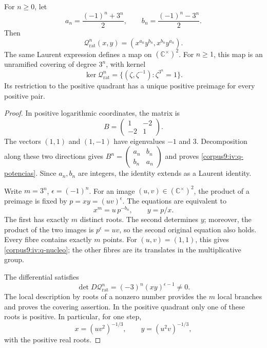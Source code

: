 \begin{proposition}
\label{corpus9:iv:q-iteracion}
For \(n\geq0\), let
\[
 a_n=\frac{(-1)^n+3^n}{2},\qquad
 b_n=\frac{(-1)^n-3^n}{2}.
\]
Then
\begin{equation}
 \mathcal Q_{\mathrm{rat}}^n(x,y)
   =(x^{a_n}y^{b_n},x^{b_n}y^{a_n}).
 \label{corpus9:iv:q-potencias}
\end{equation}
The same Laurent expression defines a map on
\((\mathbb C^\times)^2\). For \(n\geq1\), this map is an
unramified covering of degree \(3^n\), with kernel
\begin{equation}
 \ker\mathcal Q_{\mathrm{rat}}^n
   =\{(\zeta,\zeta^{-1}):\zeta^{3^n}=1\}.
 \label{corpus9:iv:q-nucleo}
\end{equation}
Its restriction to the positive quadrant has a unique positive
preimage for every positive pair.
\end{proposition}
\begin{proof}
In positive logarithmic coordinates, the matrix is
\[
 B=\begin{pmatrix}1&-2\\-2&1\end{pmatrix}.
\]
The vectors \((1,1)\) and \((1,-1)\) have eigenvalues
\(-1\) and \(3\). Decomposition along these two directions gives
\(B^n=\left(\begin{smallmatrix}a_n&b_n\\b_n&a_n\end{smallmatrix}\right)\)
and proves \eqref{corpus9:iv:q-potencias}. Since \(a_n,b_n\) are
integers, the identity extends as a Laurent identity.

Write \(m=3^n\), \(\epsilon=(-1)^n\). For an image
\((u,v)\in(\mathbb C^\times)^2\), the product of a preimage
is fixed by \(p=xy=(uv)^\epsilon\). The equations are equivalent to
\[
 x^m=u\,p^{-b_n},\qquad y=p/x.
\]
The first has exactly \(m\) distinct roots. The second
determines \(y\); moreover, the product of the two images is
\(p^\epsilon=uv\), so the second original equation also
holds. Every fibre contains exactly \(m\) points. For
\((u,v)=(1,1)\), this gives \eqref{corpus9:iv:q-nucleo}; the other
fibres are its translates in the multiplicative group.

The differential satisfies
\[
 \det D\mathcal Q_{\mathrm{rat}}^n
   =(-3)^n(xy)^{\epsilon-1}\ne0.
\]
The local description by roots of a nonzero number provides
the \(m\) local branches and proves the covering assertion.
In the positive quadrant only one of these roots is positive.
In particular, for one step,
\[
 x=(uv^2)^{-1/3},\qquad y=(u^2v)^{-1/3},
\]
with the positive real roots.
\end{proof}


